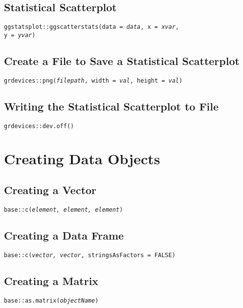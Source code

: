 \documentclass{tufte-handout}
\newenvironment{subs}
  {\adjustwidth{3em}{0pt}}
  {\endadjustwidth}
\begin{document}
\begin{subs}
\subsection{Statistical Scatterplot}
\noindent \texttt{ggstatsplot::}{\color{red}\texttt{ggscatterstats}}\texttt{(data = \textit{data}, x = \textit{xvar}, \\y = \textit{yvar})}

\vspace{3mm}
\subsection{Create a File to Save a Statistical Scatterplot}
\noindent \texttt{grdevices::}{\color{red}\texttt{png}}\texttt{(\textit{filepath}, width = \textit{val}, height = \textit{val})}

\vspace{3mm}
\subsection{Writing the Statistical Scatterplot to File}
\noindent \texttt{grdevices::}{\color{red}\texttt{dev.off}}\texttt{()}
\end{subs}

\vspace{5mm}
\section{Creating Data Objects}
\begin{subs}
\subsection{Creating a Vector}
\noindent \texttt{base::}{\color{red}\texttt{c}}\texttt{(\textit{element, element, element})}

\vspace{3mm}
\subsection{Creating a Data Frame}
\noindent \texttt{base::}{\color{red}\texttt{c}}\texttt{(\textit{vector, vector}, stringsAsFactors = FALSE)}

\vspace{3mm}
\subsection{Creating a Matrix}
\noindent \texttt{base::}{\color{red}\texttt{as.matrix}}\texttt{(\textit{objectName})}
\end{subs}
\end{document}
